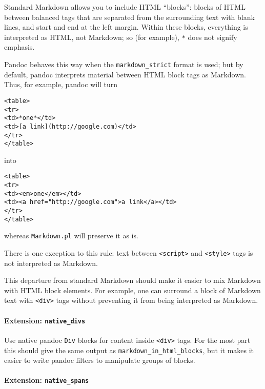 \documentclass[]{article}
\let\oldparagraph\paragraph
\renewcommand{\paragraph}[1]{\oldparagraph{#1}\mbox{}}
\begin{document}
Standard Markdown allows you to include HTML ``blocks'': blocks of HTML
between balanced tags that are separated from the surrounding text with
blank lines, and start and end at the left margin. Within these blocks,
everything is interpreted as HTML, not Markdown; so (for example),
\texttt{*} does not signify emphasis.

Pandoc behaves this way when the \texttt{markdown\_strict} format is
used; but by default, pandoc interprets material between HTML block tags
as Markdown. Thus, for example, pandoc will turn

\begin{verbatim}
<table>
<tr>
<td>*one*</td>
<td>[a link](http://google.com)</td>
</tr>
</table>
\end{verbatim}

into

\begin{verbatim}
<table>
<tr>
<td><em>one</em></td>
<td><a href="http://google.com">a link</a></td>
</tr>
</table>
\end{verbatim}

whereas \texttt{Markdown.pl} will preserve it as is.

There is one exception to this rule: text between
\texttt{\textless{}script\textgreater{}} and
\texttt{\textless{}style\textgreater{}} tags is not interpreted as
Markdown.

This departure from standard Markdown should make it easier to mix
Markdown with HTML block elements. For example, one can surround a block
of Markdown text with \texttt{\textless{}div\textgreater{}} tags without
preventing it from being interpreted as Markdown.

\paragraph{\texorpdfstring{Extension:
\texttt{native\_divs}}{Extension: native\_divs}}\label{extension-native_divs}

Use native pandoc \texttt{Div} blocks for content inside
\texttt{\textless{}div\textgreater{}} tags. For the most part this
should give the same output as \texttt{markdown\_in\_html\_blocks}, but
it makes it easier to write pandoc filters to manipulate groups of
blocks.

\paragraph{\texorpdfstring{Extension:
\texttt{native\_spans}}{Extension: native\_spans}}\label{extension-native_spans}
\end{document}
